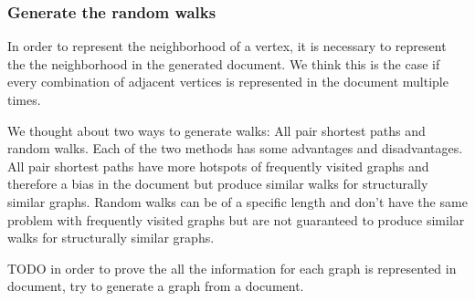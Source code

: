 \subsubsection{Generate the random walks}
In order to represent the neighborhood of a vertex, it is necessary to represent the the neighborhood in the generated document. We think this is the case if every combination of adjacent vertices is represented in the document multiple times.

We thought about two ways to generate walks: All pair shortest paths and random walks. Each of the two methods has some advantages and disadvantages. All pair shortest paths have more hotspots of frequently visited graphs and therefore a bias in the document but produce similar walks for structurally similar graphs. Random walks can be of a specific length and don't have the same problem with frequently visited graphs but are not guaranteed to produce similar walks for structurally similar graphs.

TODO in order to prove the all the information for each graph is represented in document, try to generate a graph from a document.
